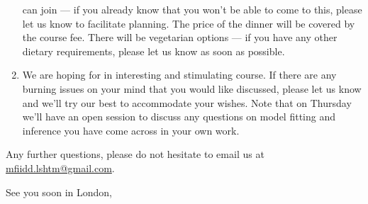 \documentclass[paper=a4, 11pt]{scrlttr2}
\begin{document}
\begin{letter}{}
\begin{enumerate}
can join --- if you already know that you won't be able to come to this,
please let us know to facilitate planning. The price of the dinner will
be covered by the course fee. There will be vegetarian options --- if you
have any other dietary requirements, please let us know as soon as
possible.
\item We are hoping for in interesting and stimulating course. If there are
any burning issues on your mind that you would like discussed, please
let us know and we'll try our best to accommodate your wishes. Note
that on Thursday we'll have an open session to discuss any
questions on model fitting and inference you
have come across in your own work.  

\end{enumerate}
Any further questions, please do not hesitate to email us at \href{mailto:mfiidd.lshtm@gmail.com}{mfiidd.lshtm@gmail.com}.

\closing{See you soon in London,}
\end{letter}
\end{document}
